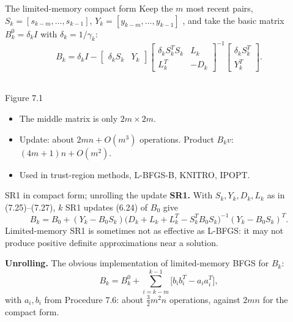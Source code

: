 \documentclass[aspectratio=169,12pt]{beamer}
\newcommand{\eqn}[1]{\text{\small(#1)}}
\begin{document}
\begin{frame}{The limited-memory compact form}
  Keep the $m$ most recent pairs, $S_{k}=[s_{k-m},\dots,s_{k-1}]$, $Y_{k}=[y_{k-m},\dots,y_{k-1}]$ \eqn{7.28},
  and take the basic matrix $B_{k}^{0}=\delta_{k}I$ with $\delta_{k}=1/\gamma_{k}$:
  \[
    B_{k}=\delta_{k}I-\begin{bmatrix}\delta_{k}S_{k}&Y_{k}\end{bmatrix}
    \begin{bmatrix}\delta_{k}S_{k}^{T}S_{k}&L_{k}\\ L_{k}^{T}&-D_{k}\end{bmatrix}^{-1}
    \begin{bmatrix}\delta_{k}S_{k}^{T}\\ Y_{k}^{T}\end{bmatrix} .
    \tag{7.29}
  \]

  \begin{minipage}[c]{0.40\textwidth}
    \centering
    \\
    {\small Figure 7.1}
  \end{minipage}\hfill
  \begin{minipage}[c]{0.58\textwidth}
    \begin{itemize}\setlength\itemsep{0.3em}
      \item The middle matrix is only $2m\times 2m$.
      \item Update: about $2mn+O(m^{3})$ operations.
        Product $B_{k}v$: $(4m+1)n+O(m^{2})$.
      \item Used in trust-region methods, L-BFGS-B, KNITRO, IPOPT.
    \end{itemize}
  \end{minipage}
\end{frame}

\begin{frame}{SR1 in compact form; unrolling the update}
  \textbf{SR1.} With $S_{k},Y_{k},D_{k},L_{k}$ as in (7.25)--(7.27), $k$ SR1 updates (6.24) of $B_{0}$ give
  \[
    B_{k}=B_{0}+(Y_{k}-B_{0}S_{k})\big(D_{k}+L_{k}+L_{k}^{T}-S_{k}^{T}B_{0}S_{k}\big)^{-1}(Y_{k}-B_{0}S_{k})^{T} .
    \tag{7.30}
  \]
  Limited-memory SR1 is sometimes not as effective as L-BFGS: it may not produce
  positive definite approximations near a solution.

  \vspace{0.3em}
  \textbf{Unrolling.} The obvious implementation of limited-memory BFGS for $B_{k}$:
  \[ B_{k}=B_{k}^{0}+\sum_{i=k-m}^{k-1}\big[b_{i}b_{i}^{T}-a_{i}a_{i}^{T}\big] , \tag{7.33} \]
  with $a_{i},b_{i}$ from Procedure 7.6: about $\tfrac32m^{2}n$ operations, against $2mn$ for the compact form.
\end{frame}
\end{document}
